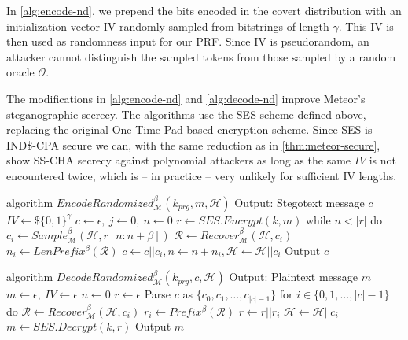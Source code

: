 In \autoref{alg:encode-nd}, we prepend the bits encoded in the covert distribution with an initialization vector IV randomly sampled from bitstrings of length $\gamma$.
This IV is then used as randomness input for our PRF.
Since IV is pseudorandom, an attacker cannot distinguish the sampled tokens from those sampled by a random oracle $\mathcal{O}$.

The modifications in \autoref{alg:encode-nd} and \autoref{alg:decode-nd} improve Meteor's steganographic secrecy.
The algorithms use the SES scheme defined above, replacing the original One-Time-Pad based encryption scheme.
Since SES is IND\$-CPA secure we can, with the same reduction as in \autoref{thm:meteor-secure}, show SS-CHA secrecy against polynomial attackers as long as the same $IV$ is not encountered twice, which is -- in practice -- very unlikely for sufficient IV lengths.


\begin{Pseudocode}[float, caption={
Meteor EncodeRandomized Algorithm.
This algorithm differs from the original Encode algorithm by using a SES to encrypt the message.
The ciphertext (which is indistinguishable from randomness) is then used to sample from $\mathcal{M}$.
}, label={alg:encode-nd}]
algorithm $EncodeRandomized_{\mathcal{M}}^{\beta}(k_{prg}, m, \mathcal{H})$
	Output: Stegotext message $c$
	$IV \leftarrow\$ \{0,1\}^\gamma$
	$c \leftarrow \epsilon,~ j \leftarrow 0,~ n \leftarrow 0$
	$r \leftarrow SES.Encrypt(k, m)$
	while $n < |r|$ do
		$c_i \leftarrow Sample_{\mathcal{M}}^\beta(\mathcal{H}, r[n: n+\beta])$
		$\mathcal{R} \leftarrow Recover_{\mathcal{M}}^\beta(\mathcal{H}, c_i)$
		$n_i \leftarrow LenPrefix^\beta(\mathcal{R})$
		$c \leftarrow c || c_i, n \leftarrow n+n_i, \mathcal{H} \leftarrow \mathcal{H}||c_i$
	Output $c$
\end{Pseudocode}
\begin{Pseudocode}[float, caption={
Meteor DecodeRandomized Algorithm.
This algorithm differs from the original Decode algorithm by interpreting the first $\gamma$ bits of the hiddentext as IV.
After decoding $\gamma$ bits of hiddentext, a PRF is initialized with IV for generation of pseudorandom masks.}, label={alg:decode-nd}]
algorithm $DecodeRandomized_{\mathcal{M}}^{\beta}(k_{prg}, c, \mathcal{H})$
	Output: Plaintext message $m$
	$m \leftarrow \epsilon,~ IV \leftarrow \epsilon$
	$n \leftarrow 0$
	$r \leftarrow \epsilon$
	Parse $c$ as $\{ c_0, c_1, \dots, c_{|c|-1} \}$
	for $i \in \{0, 1, \dots, |c|-1 \}$ do
		$\mathcal{R} \leftarrow Recover_{\mathcal{M}}^\beta(\mathcal{H}, c_i)$
		$r_i \leftarrow Prefix^\beta(\mathcal{R})$
		$r \leftarrow r || r_i$
		$\mathcal{H} \leftarrow \mathcal{H}||c_i$
	$m \leftarrow SES.Decrypt(k, r)$
	Output $m$
\end{Pseudocode}